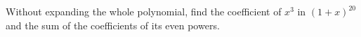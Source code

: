 Without expanding the whole polynomial, find the coefficient of $x^3$ in $(1+x)^{20}$ and the sum of the coefficients of its even powers.
